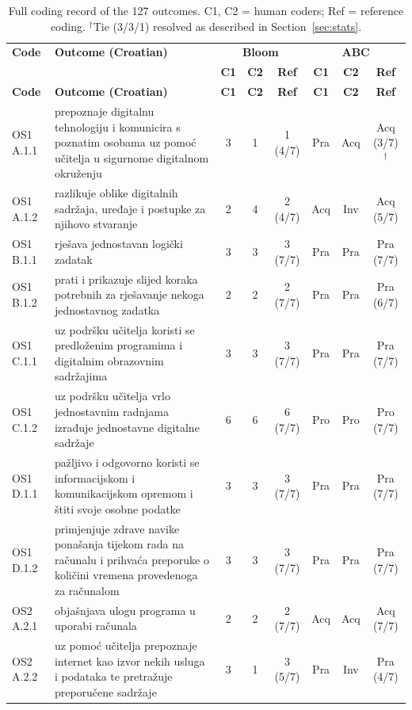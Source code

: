 \documentclass[journal,article,submit,pdftex,moreauthors]{Definitions/mdpi}
\begin{document}
{\scriptsize
\setlength{\tabcolsep}{2pt}
\begin{longtable}{p{1.35cm}p{6.6cm}cccccc}
\caption{Full coding record of the 127 outcomes. C1, C2 = human coders; Ref = reference coding. $^{\dagger}$Tie (3/3/1) resolved as described in Section~\ref{sec:stats}.}
\label{tab:fullcoding}\\
\toprule
\textbf{Code} & \textbf{Outcome (Croatian)} & \multicolumn{3}{c}{\textbf{Bloom}} & \multicolumn{3}{c}{\textbf{ABC}} \\
 & & \textbf{C1} & \textbf{C2} & \textbf{Ref} & \textbf{C1} & \textbf{C2} & \textbf{Ref} \\
\midrule
\endfirsthead
\toprule
\textbf{Code} & \textbf{Outcome (Croatian)} & \textbf{C1} & \textbf{C2} & \textbf{Ref} & \textbf{C1} & \textbf{C2} & \textbf{Ref} \\
\midrule
\endhead
\bottomrule
\endfoot
OS1 A.1.1 & prepoznaje digitalnu tehnologiju i komunicira s poznatim osobama uz pomoć učitelja u sigurnome digitalnom okruženju & 3 & 1 & 1 (4/7) & Pra & Acq & Acq (3/7)$^{\dagger}$ \\
OS1 A.1.2 & razlikuje oblike digitalnih sadržaja, uređaje i postupke za njihovo stvaranje & 2 & 4 & 2 (4/7) & Acq & Inv & Acq (5/7) \\
OS1 B.1.1 & rješava jednostavan logički zadatak & 3 & 3 & 3 (7/7) & Pra & Pra & Pra (7/7) \\
OS1 B.1.2 & prati i prikazuje slijed koraka potrebnih za rješavanje nekoga jednostavnog zadatka & 2 & 2 & 2 (7/7) & Pra & Pra & Pra (6/7) \\
OS1 C.1.1 & uz podršku učitelja koristi se predloženim programima i digitalnim obrazovnim sadržajima & 3 & 3 & 3 (7/7) & Pra & Pra & Pra (7/7) \\
OS1 C.1.2 & uz podršku učitelja vrlo jednostavnim radnjama izrađuje jednostavne digitalne sadržaje & 6 & 6 & 6 (7/7) & Pro & Pro & Pro (7/7) \\
OS1 D.1.1 & pažljivo i odgovorno koristi se informacijskom i komunikacijskom opremom i štiti svoje osobne podatke & 3 & 3 & 3 (7/7) & Pra & Pra & Pra (7/7) \\
OS1 D.1.2 & primjenjuje zdrave navike ponašanja tijekom rada na računalu i prihvaća preporuke o količini vremena provedenoga za računalom & 3 & 3 & 3 (7/7) & Pra & Pra & Pra (7/7) \\
OS2 A.2.1 & objašnjava ulogu programa u uporabi računala & 2 & 2 & 2 (7/7) & Acq & Acq & Acq (7/7) \\
OS2 A.2.2 & uz pomoć učitelja prepoznaje internet kao izvor nekih usluga i podataka te pretražuje preporučene sadržaje & 3 & 1 & 3 (5/7) & Pra & Inv & Pra (4/7) \\

\end{longtable}}
\end{document}
